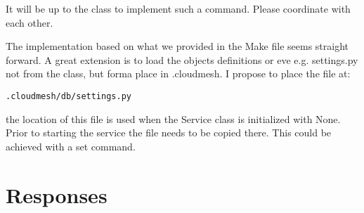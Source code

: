 It will be up to the class to implement such a command. Please
coordinate with each other.

The implementation based on what we provided in the Make file seems
straight forward. A great extension is to load the objects definitions
or eve e.g. settings.py not from the class, but forma place in
.cloudmesh. I propose to place the file at:

\begin{lstlisting}
.cloudmesh/db/settings.py
\end{lstlisting}

the location of this file is used when the Service class is initialized
with None. Prior to starting the service the file needs to be copied
there. This could be achieved with a set command.

\section{Responses}

